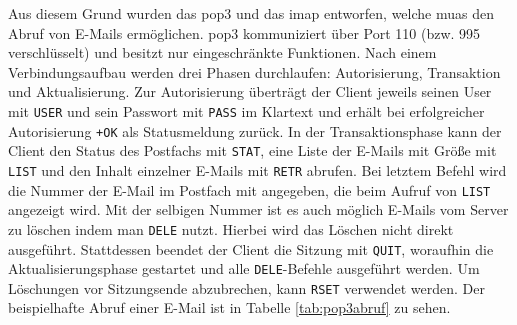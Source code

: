 Aus diesem Grund wurden das \acrfull{pop3} und das \acrfull{imap} entworfen, welche \acrshort{mua}s den Abruf von E-Mails ermöglichen. \acrshort{pop3} kommuniziert über Port 110 (bzw. 995 verschlüsselt) und besitzt nur eingeschränkte Funktionen. Nach einem Verbindungsaufbau werden drei Phasen durchlaufen: Autorisierung, Transaktion und Aktualisierung. Zur Autorisierung überträgt der Client jeweils seinen User mit \texttt{USER} und sein Passwort mit \texttt{PASS} im Klartext und erhält bei erfolgreicher Autorisierung \texttt{+OK} als Statusmeldung zurück. In der Transaktionsphase kann der Client den Status des Postfachs mit \texttt{STAT}, eine Liste der E-Mails mit Größe mit \texttt{LIST} und den Inhalt einzelner E-Mails mit \texttt{RETR} abrufen. Bei letztem Befehl wird die Nummer der E-Mail im Postfach mit angegeben, die beim Aufruf von \texttt{LIST} angezeigt wird. Mit der selbigen Nummer ist es auch möglich E-Mails vom Server zu löschen indem man \texttt{DELE} nutzt. Hierbei wird das Löschen nicht direkt ausgeführt. Stattdessen beendet der Client die Sitzung mit \texttt{QUIT}, woraufhin die Aktualisierungsphase gestartet und alle \texttt{DELE}-Befehle ausgeführt werden. Um Löschungen vor Sitzungsende abzubrechen, kann \texttt{RSET} verwendet werden. Der beispielhafte Abruf einer E-Mail ist in Tabelle \ref{tab:pop3abruf} zu sehen. \citep[S. 3 ff.]{RFC1939}


